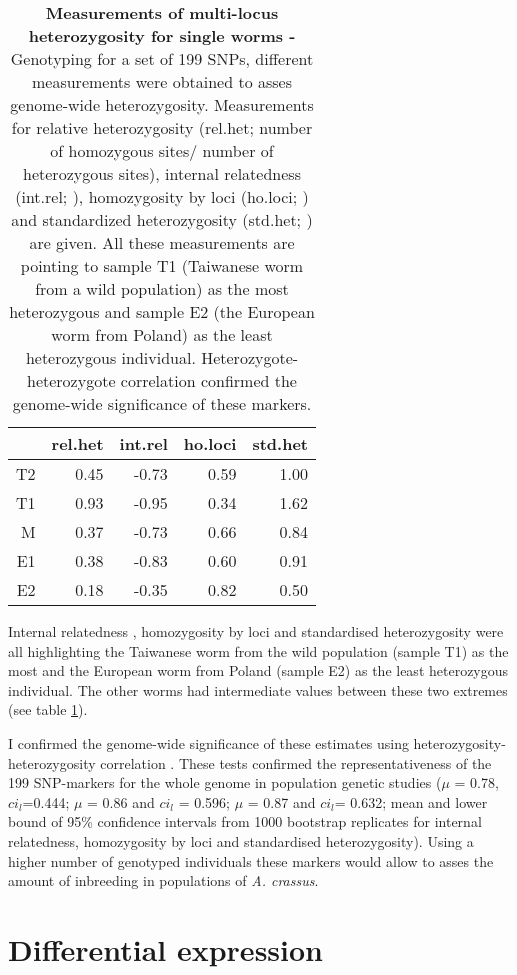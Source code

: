 \begin{table}[ht]
\begin{center}
\begin{tabular}{rrrrr}
  \hline
 & rel.het & int.rel & ho.loci & std.het \\ 
  \hline
T2 & 0.45 & -0.73 & 0.59 & 1.00 \\ 
  T1 & 0.93 & -0.95 & 0.34 & 1.62 \\ 
  M & 0.37 & -0.73 & 0.66 & 0.84 \\ 
  E1 & 0.38 & -0.83 & 0.60 & 0.91 \\ 
  E2 & 0.18 & -0.35 & 0.82 & 0.50 \\ 
   \hline
\end{tabular}
\caption[Measurements of multi-locus heterozygosity for single
worms]{\textbf{Measurements of multi-locus heterozygosity for single
    worms -} Genotyping for a set of 199 SNPs, different measurements
  were obtained to asses genome-wide heterozygosity.  Measurements for
  relative heterozygosity (rel.het; number of homozygous sites/ number
  of heterozygous sites), internal relatedness (int.rel;
  \cite{pmid11571049}), homozygosity by loci (ho.loci;
  \cite{pmid17107491}) and standardized heterozygosity (std.het;
  \cite{coltman81j}) are given.  All these measurements are pointing
  to sample T1 (Taiwanese worm from a wild population) as the most
  heterozygous and sample E2 (the European worm from Poland) as the
  least heterozygous individual. Heterozygote-heterozygote correlation
  \cite{pmid21565077} confirmed the genome-wide significance of these
  markers.}
\label{snp-sing}
\end{center}
\end{table}

Internal relatedness \cite{pmid11571049}, homozygosity by loci
\cite{pmid17107491} and standardised heterozygosity \cite{coltman81j}
were all highlighting the Taiwanese worm from the wild population
(sample T1) as the most and the European worm from Poland (sample E2)
as the least heterozygous individual. The other worms had intermediate
values between these two extremes (see table \ref{snp-sing}).

I confirmed the genome-wide significance of these estimates using
heterozygosity-heterozygosity correlation \cite{pmid21565077}. These
tests confirmed the representativeness of the 199 SNP-markers for the
whole genome in population genetic studies ($\mu$ = 0.78,
$ci_l$=0.444; $\mu$ = 0.86 and $ci_l$ = 0.596; $\mu$ = 0.87 and
$ci_l$= 0.632; mean and lower bound of 95\% confidence intervals from
1000 bootstrap replicates for internal relatedness, homozygosity by
loci and standardised heterozygosity). Using a higher number of
genotyped individuals these markers would allow to asses the amount of
inbreeding in populations of \textit{A. crassus}.


\section{Differential expression}





